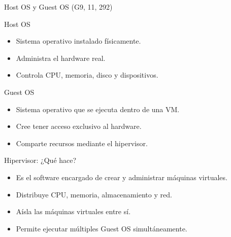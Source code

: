 \documentclass[presentation]{beamer}
\begin{document}
\begin{frame}[label={sec:orgc9c6ce7}]{Host OS y Guest OS (G9, 11, 292)}
\begin{block}{Host OS}
\begin{itemize}
\item Sistema operativo instalado físicamente.
\item Administra el hardware real.
\item Controla CPU, memoria, disco y dispositivos.
\end{itemize}
\end{block}

\begin{block}{Guest OS}
\begin{itemize}
\item Sistema operativo que se ejecuta dentro de una VM.
\item Cree tener acceso exclusivo al hardware.
\item Comparte recursos mediante el hipervisor.
\end{itemize}
\end{block}
\end{frame}

\begin{frame}[label={sec:orgb465072}]{Hipervisor: ¿Qué hace?}
\begin{itemize}
\item Es el software encargado de crear y administrar máquinas virtuales.
\item Distribuye CPU, memoria, almacenamiento y red.
\item Aísla las máquinas virtuales entre sí.
\item Permite ejecutar múltiples Guest OS simultáneamente.
\end{itemize}
\end{frame}
\end{document}
